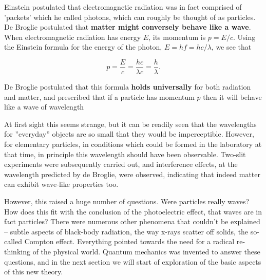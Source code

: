 \documentclass{article}
\begin{document}
Einstein postulated that electromagnetic radiation was in fact comprised of 'packets' which he called photons, which can roughly be thought of as particles. De Broglie postulated that \textbf{matter might conversely behave like a wave}. When electromagnetic radiation has energy $E$, its momentum is $p = E/c$. Using the Einstein formula for the energy of the photon, $E = hf = hc/\lambda$, we see that

\begin{equation}
p = \frac{E}{c} = \frac{hc}{\lambda c} = \frac{h}{\lambda}.
\end{equation}

De Broglie postulated that this formula \textbf{holds universally} for both radiation and matter, and prescribed that if a particle has momentum $p$ then it will behave like a wave of wavelength

At first sight this seems strange, but it can be readily seen that the wavelengths for ''everyday'' objects are so small that they would be imperceptible. However, for elementary particles, in conditions which could be formed in the laboratory at that time, in principle this wavelength should have been observable. Two-slit experiments were subsequently carried out, and interference effects, at the wavelength predicted by de Broglie, were observed, indicating that indeed matter can exhibit wave-like properties too.

However, this raised a huge number of questions. Were particles really waves? How does this fit with the conclusion of the photoelectric effect, that waves are in fact particles? There were numerous other phenomena that couldn't be explained -- subtle aspects of black-body radiation, the way x-rays scatter off solids, the so-called Compton effect. Everything pointed towards the need for a radical re-thinking of the physical world. Quantum mechanics was invented to answer these questions, and in the next section we will start of exploration of the basic aspects of this new theory.



\end{document}
